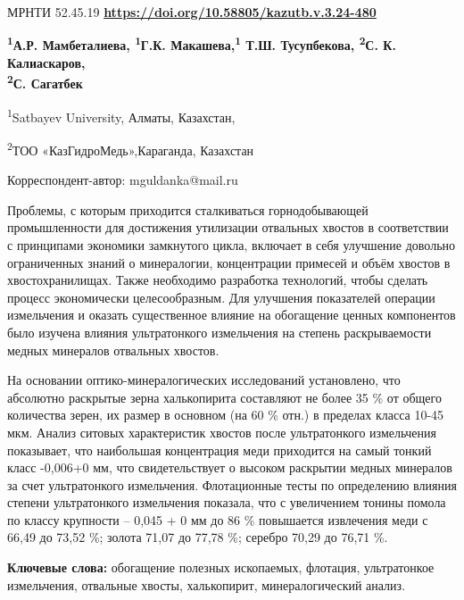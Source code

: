 \newpage
МРНТИ 52.45.19
\hfill {\bfseries \href{https://doi.org/10.58805/kazutb.v.3.24-480}{https://doi.org/10.58805/kazutb.v.3.24-480}}


\begin{center}
{\bfseries \textsuperscript{1}А.Р. Мамбеталиева, \textsuperscript{1}Г.К. Макашева\envelope,\textsuperscript{1} Т.Ш. Тусупбекова, \textsuperscript{2}С. К. Калиаскаров, \\\textsuperscript{2}С. Сагатбек}

\textsuperscript{1}Satbayev University, Алматы, Казахстан,

\textsuperscript{2}ТОО «КазГидроМедь»,Караганда, Казахстан
\end{center}
\envelope Корреспондент-автор: mguldanka@mail.ru


Проблемы, с которым приходится сталкиваться горнодобывающей
промышленности для достижения утилизации отвальных хвостов в
соответствии с принципами экономики замкнутого цикла, включает в себя
улучшение довольно ограниченных знаний о минералогии, концентрации
примесей и объём хвостов в хвостохранилищах. Также необходимо разработка
технологий, чтобы сделать процесс экономически целесообразным. Для
улучшения показателей операции измельчения и оказать существенное
влияние на обогащение ценных компонентов было изучена влияния
ультратонкого измельчения на степень раскрываемости медных минералов
отвальных хвостов.

На основании оптико-минералогических исследований установлено, что
абсолютно раскрытые зерна халькопирита составляют не более 35 \% от
общего количества зерен, их размер в основном (на 60 \% отн.) в пределах
класса 10-45 мкм. Анализ ситовых характеристик хвостов после
ультратонкого измельчения показывает, что наибольшая концентрация меди
приходится на самый тонкий класс -0,006+0 мм, что свидетельствует о
высоком раскрытии медных минералов за счет ультратонкого измельчения.
Флотационные тесты по определению влияния степени ультратонкого
измельчения показала, что с увеличением тонины помола по классу
крупности -- 0,045 + 0 мм до 86 \% повышается извлечения меди с 66,49 до
73,52 \%; золота 71,07 до 77,78 \%; серебро 70,29 до 76,71 \%.

{\bfseries Ключевые слова:} обогащение полезных ископаемых, флотация,
ультратонкое измельчения, отвальные хвосты, халькопирит,
минералогический анализ.

